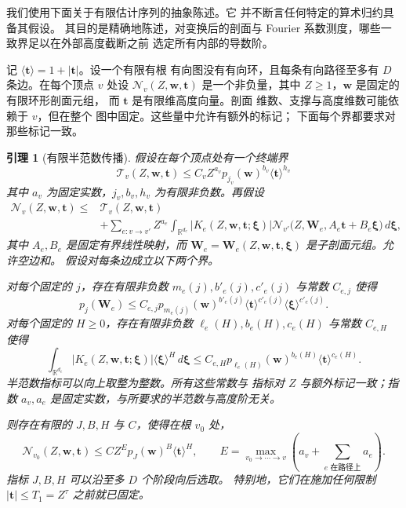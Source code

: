 \documentclass[11pt,a4paper]{article}
\numberwithin{equation}{section}
\numberwithin{figure}{section}
\newtheorem{lemma}[theorem]{引理}
\theoremstyle{definition}
\theoremstyle{remark}
\begin{document}
我们使用下面关于有限估计序列的抽象陈述。它
并不断言任何特定的算术归约具备其假设。
其目的是精确地陈述，对变换后的剖面与
Fourier 系数测度，哪些一致界足以在外部高度截断之前
选定所有内部的导数阶。

记 $\langle\boldsymbol t\rangle=1+|\boldsymbol t|$。设一个有限有根
有向图没有有向环，且每条有向路径至多有
$D$ 条边。在每个顶点 $v$ 处设
$\mathcal N_v(Z,\boldsymbol w,\boldsymbol t)$ 是一个非负量，其中
$Z\ge1$，$\boldsymbol w$ 是固定的有限环形剖面元组，
而 $\boldsymbol t$ 是有限维高度向量。剖面
维数、支撑与高度维数可能依赖于 $v$，但在整个
图中固定。这些量中允许有额外的标记；
下面每个界都要求对那些标记一致。

\begin{lemma}[有限半范数传播]\label{lem:finite-seminorm-propagation}
假设在每个顶点处有一个终端界
\[
 \mathcal T_v(Z,\boldsymbol w,\boldsymbol t)
 \le C_v Z^{a_v}p_{j_v}(\boldsymbol w)^{b_v}
                   \langle\boldsymbol t\rangle^{h_v}
\]
其中 $a_v$ 为固定实数，$j_v,b_v,h_v$ 为有限非负数。再假设
\[
 \begin{split}
 \mathcal N_v(Z,\boldsymbol w,\boldsymbol t)
 \le{}&\mathcal T_v(Z,\boldsymbol w,\boldsymbol t)\\
 &+\sum_{e:v\to v'}Z^{a_e}\int_{\mathbb R^{d_e}}
 |K_e(Z,\boldsymbol w,\boldsymbol t;\boldsymbol\xi)|
 \mathcal N_{v'}\bigl(Z,\boldsymbol W_e,
       A_e\boldsymbol t+B_e\boldsymbol\xi\bigr)\,d\boldsymbol\xi,
 \end{split}
\]
其中 $A_e,B_e$ 是固定有界线性映射，而
$\boldsymbol W_e=\boldsymbol W_e(Z,\boldsymbol w,\boldsymbol t,
\boldsymbol\xi)$ 是子剖面元组。允许空边和。
假设对每条边成立以下两个界。

对每个固定的 $j$，存在有限非负数
$m_e(j),b'_e(j),c'_e(j)$ 与常数 $C_{e,j}$ 使得
\[
 p_j(\boldsymbol W_e)
 \le C_{e,j}p_{m_e(j)}(\boldsymbol w)^{b'_e(j)}
       \langle\boldsymbol t\rangle^{c'_e(j)}
       \langle\boldsymbol\xi\rangle^{c'_e(j)}.
\]
对每个固定的 $H\ge0$，存在有限非负数
$\ell_e(H),b_e(H),c_e(H)$ 与常数 $C_{e,H}$ 使得
\[
 \int_{\mathbb R^{d_e}}|K_e(Z,\boldsymbol w,\boldsymbol t;
            \boldsymbol\xi)|\langle\boldsymbol\xi\rangle^H
                         \,d\boldsymbol\xi
 \le C_{e,H}p_{\ell_e(H)}(\boldsymbol w)^{b_e(H)}
                 \langle\boldsymbol t\rangle^{c_e(H)}.
\]
半范数指标可以向上取整为整数。所有这些常数与
指标对 $Z$ 与额外标记一致；指数 $a_v,a_e$
是固定实数，与所要求的半范数与高度阶无关。

则存在有限的 $J,B,H$ 与 $C$，使得在根 $v_0$ 处，
\[
 \mathcal N_{v_0}(Z,\boldsymbol w,\boldsymbol t)
 \le C Z^E p_J(\boldsymbol w)^B\langle\boldsymbol t\rangle^H,
 \qquad
 E=\max_{v_0\to\cdots\to v}
       \left(a_v+\sum_{e\text{ 在路径上}}a_e\right).
\]
指标 $J,B,H$ 可以沿至多 $D$ 个阶段向后选取。
特别地，它们在施加任何限制
$|\boldsymbol t|\le T_1=Z^\tau$ 之前就已固定。


\end{lemma}
\end{document}
